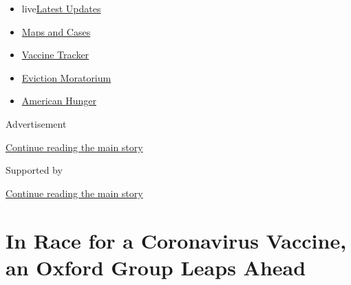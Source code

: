 \begin{itemize}
\tightlist
\item
  live\href{https://www.nytimes3xbfgragh.onion/2020/09/05/world/coronavirus-covid.html?name=styln-coronavirus-national\&region=TOP_BANNER\&block=storyline_menu_recirc\&action=click\&pgtype=Article\&impression_id=1010d8c0-efb5-11ea-8c1d-cb4966d29e98\&variant=undefined}{Latest
  Updates}
\item
  \href{https://www.nytimes3xbfgragh.onion/interactive/2020/us/coronavirus-us-cases.html?name=styln-coronavirus-national\&region=TOP_BANNER\&block=storyline_menu_recirc\&action=click\&pgtype=Article\&impression_id=1010d8c1-efb5-11ea-8c1d-cb4966d29e98\&variant=undefined}{Maps
  and Cases}
\item
  \href{https://www.nytimes3xbfgragh.onion/interactive/2020/science/coronavirus-vaccine-tracker.html?name=styln-coronavirus-national\&region=TOP_BANNER\&block=storyline_menu_recirc\&action=click\&pgtype=Article\&impression_id=1010d8c2-efb5-11ea-8c1d-cb4966d29e98\&variant=undefined}{Vaccine
  Tracker}
\item
  \href{https://www.nytimes3xbfgragh.onion/2020/09/02/your-money/eviction-moratorium-covid.html?name=styln-coronavirus-national\&region=TOP_BANNER\&block=storyline_menu_recirc\&action=click\&pgtype=Article\&impression_id=1010d8c3-efb5-11ea-8c1d-cb4966d29e98\&variant=undefined}{Eviction
  Moratorium}
\item
  \href{https://www.nytimes3xbfgragh.onion/interactive/2020/09/02/magazine/food-insecurity-hunger-us.html?name=styln-coronavirus-national\&region=TOP_BANNER\&block=storyline_menu_recirc\&action=click\&pgtype=Article\&impression_id=1010d8c4-efb5-11ea-8c1d-cb4966d29e98\&variant=undefined}{American
  Hunger}
\end{itemize}

Advertisement

\protect\hyperlink{after-top}{Continue reading the main story}

Supported by

\protect\hyperlink{after-sponsor}{Continue reading the main story}

\hypertarget{in-race-for-a-coronavirus-vaccine-an-oxford-group-leaps-ahead}{%
\section{In Race for a Coronavirus Vaccine, an Oxford Group Leaps
Ahead}\label{in-race-for-a-coronavirus-vaccine-an-oxford-group-leaps-ahead}}

